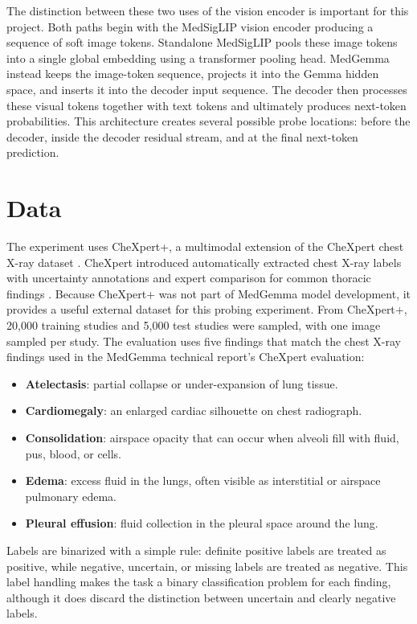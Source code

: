 \documentclass{article}
\begin{document}
The distinction between these two uses of the vision encoder is important for this project.
Both paths begin with the MedSigLIP vision encoder producing a sequence of soft image tokens.
Standalone MedSigLIP pools these image tokens into a single global embedding using a transformer pooling head.
MedGemma instead keeps the image-token sequence, projects it into the Gemma hidden space, and inserts it into the decoder input sequence.
The decoder then processes these visual tokens together with text tokens and ultimately produces next-token probabilities.
This architecture creates several possible probe locations: before the decoder, inside the decoder residual stream, and at the final next-token prediction.

\section{Data}

The experiment uses CheXpert+, a multimodal extension of the CheXpert chest X-ray dataset \citep{chambon2024chexpertplus}.
CheXpert introduced automatically extracted chest X-ray labels with uncertainty annotations and expert comparison for common thoracic findings \citep{irvin2019chexpert}.
Because CheXpert+ was not part of MedGemma model development, it provides a useful external dataset for this probing experiment.
From CheXpert+, 20,000 training studies and 5,000 test studies were sampled, with one image sampled per study.
The evaluation uses five findings that match the chest X-ray findings used in the MedGemma technical report's CheXpert evaluation:
\begin{itemize}[leftmargin=*]
    \item \textbf{Atelectasis}: partial collapse or under-expansion of lung tissue.
    \item \textbf{Cardiomegaly}: an enlarged cardiac silhouette on chest radiograph.
    \item \textbf{Consolidation}: airspace opacity that can occur when alveoli fill with fluid, pus, blood, or cells.
    \item \textbf{Edema}: excess fluid in the lungs, often visible as interstitial or airspace pulmonary edema.
    \item \textbf{Pleural effusion}: fluid collection in the pleural space around the lung.
\end{itemize}
Labels are binarized with a simple rule: definite positive labels are treated as positive, while negative, uncertain, or missing labels are treated as negative.
This label handling makes the task a binary classification problem for each finding, although it does discard the distinction between uncertain and clearly negative labels.
\end{document}
